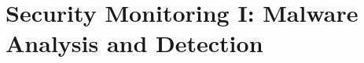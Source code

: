 \documentclass[../main.tex]{subfiles}
\begin{document}
\chapter{Security Monitoring I: Malware Analysis and Detection}
\label{ch:malware-analysis-detection}

\end{document}
